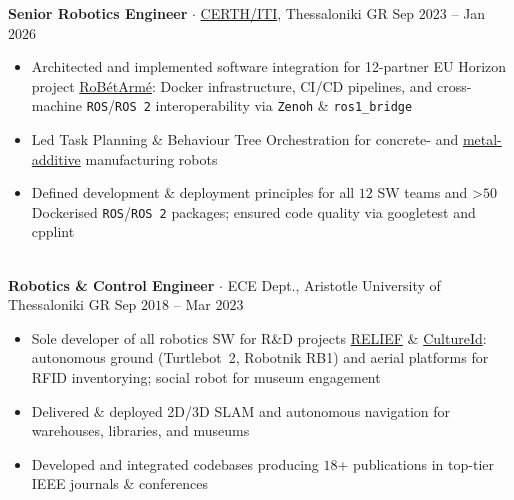 \documentclass[a4paper,10pt,twoside]{article}
\begin{document}
  \noindent\textbf{Senior Robotics Engineer} $\cdot$ \href{https://robotics.iti.gr/en/home/}{CERTH/ITI}, Thessaloniki GR \hfill {\small \textcolor{agray}{Sep $2023$ -- Jan $2026$}} \\
  \begin{minipage}[t]{\textwidth}
    \begin{itemize}
      \item Architected and implemented software integration for 12-partner EU Horizon project \href{https://www.robetarme-project.eu/sobre/}{RoBétArmé}: Docker infrastructure, CI/CD pipelines, and cross-machine \texttt{ROS}/\texttt{ROS~2} interoperability via \texttt{Zenoh} \& \texttt{ros1\_bridge}\verticalspaceafteritem
    \item Led Task Planning \& Behaviour Tree Orchestration for concrete- and \href{https://www.youtube.com/watch?v=xuIbOL-MPRk}{metal-additive} manufacturing robots\verticalspaceafteritem
      \item Defined development \& deployment principles for all $12$ SW teams and >$50$ Dockerised \texttt{ROS}/\texttt{ROS~2} packages; ensured code quality via googletest and cpplint
    \end{itemize}
  \end{minipage} \\[-0.2em]

  \noindent\textbf{Robotics \& Control Engineer} $\cdot$ ECE Dept., Aristotle University of Thessaloniki GR \hfill {\small \textcolor{agray}{Sep $2018$ -- Mar $2023$}} \\
  \begin{minipage}[t]{\textwidth}
    \begin{itemize}
      \item Sole developer of all robotics SW for R\&D projects \href{https://relief.web.auth.gr/language/en/home/\#pg-72-1}{RELIEF} \& \href{https://cultureid.web.auth.gr/?page\_id=200&lang=en}{CultureId}: autonomous ground (Turtlebot~2, Robotnik RB1) and aerial platforms for RFID inventorying; social robot for museum engagement\verticalspaceafteritem
      \item Delivered \& deployed 2D/3D SLAM and autonomous navigation for warehouses, libraries, and museums \verticalspaceafteritem
      \item Developed and integrated codebases producing $18$+ publications in top-tier IEEE journals \& conferences
    \end{itemize}
  \end{minipage} \\[-0.2em]
\end{document}
